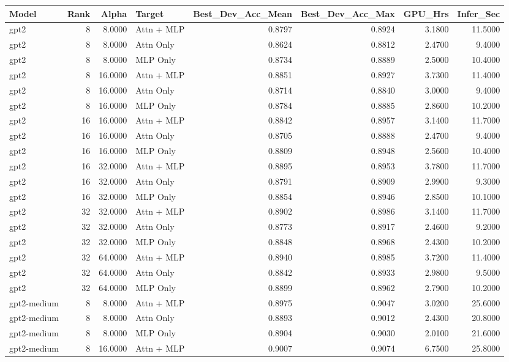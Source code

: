 \begin{tabular}{lrrlrrrr}
\toprule
Model & Rank & Alpha & Target & Best_Dev_Acc_Mean & Best_Dev_Acc_Max & GPU_Hrs & Infer_Sec \\
\midrule
gpt2 & 8 & 8.0000 & Attn + MLP & 0.8797 & 0.8924 & 3.1800 & 11.5000 \\
gpt2 & 8 & 8.0000 & Attn Only & 0.8624 & 0.8812 & 2.4700 & 9.4000 \\
gpt2 & 8 & 8.0000 & MLP Only & 0.8734 & 0.8889 & 2.5000 & 10.4000 \\
gpt2 & 8 & 16.0000 & Attn + MLP & 0.8851 & 0.8927 & 3.7300 & 11.4000 \\
gpt2 & 8 & 16.0000 & Attn Only & 0.8714 & 0.8840 & 3.0000 & 9.4000 \\
gpt2 & 8 & 16.0000 & MLP Only & 0.8784 & 0.8885 & 2.8600 & 10.2000 \\
gpt2 & 16 & 16.0000 & Attn + MLP & 0.8842 & 0.8957 & 3.1400 & 11.7000 \\
gpt2 & 16 & 16.0000 & Attn Only & 0.8705 & 0.8888 & 2.4700 & 9.4000 \\
gpt2 & 16 & 16.0000 & MLP Only & 0.8809 & 0.8948 & 2.5600 & 10.4000 \\
gpt2 & 16 & 32.0000 & Attn + MLP & 0.8895 & 0.8953 & 3.7800 & 11.7000 \\
gpt2 & 16 & 32.0000 & Attn Only & 0.8791 & 0.8909 & 2.9900 & 9.3000 \\
gpt2 & 16 & 32.0000 & MLP Only & 0.8854 & 0.8946 & 2.8500 & 10.1000 \\
gpt2 & 32 & 32.0000 & Attn + MLP & 0.8902 & 0.8986 & 3.1400 & 11.7000 \\
gpt2 & 32 & 32.0000 & Attn Only & 0.8773 & 0.8917 & 2.4600 & 9.2000 \\
gpt2 & 32 & 32.0000 & MLP Only & 0.8848 & 0.8968 & 2.4300 & 10.2000 \\
gpt2 & 32 & 64.0000 & Attn + MLP & 0.8940 & 0.8985 & 3.7200 & 11.4000 \\
gpt2 & 32 & 64.0000 & Attn Only & 0.8842 & 0.8933 & 2.9800 & 9.5000 \\
gpt2 & 32 & 64.0000 & MLP Only & 0.8899 & 0.8962 & 2.7900 & 10.2000 \\
gpt2-medium & 8 & 8.0000 & Attn + MLP & 0.8975 & 0.9047 & 3.0200 & 25.6000 \\
gpt2-medium & 8 & 8.0000 & Attn Only & 0.8893 & 0.9012 & 2.4300 & 20.8000 \\
gpt2-medium & 8 & 8.0000 & MLP Only & 0.8904 & 0.9030 & 2.0100 & 21.6000 \\
gpt2-medium & 8 & 16.0000 & Attn + MLP & 0.9007 & 0.9074 & 6.7500 & 25.8000 \\

\end{tabular}
